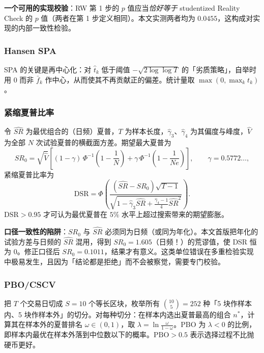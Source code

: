 \textbf{一个可用的实现校验}：RW 第 1 步的 $p$ 值应当\emph{恰好等于} studentized Reality Check 的 $p$ 值（两者在第 1 步定义相同）。本文实测两者均为 $0.0455$，这构成对实现的内部一致性检验。

\subsubsection*{Hansen SPA}

SPA 的关键是再中心化：对 $\hat t_k$ 低于阈值 $-\sqrt{2\log\log T}$ 的「劣质策略」，自举时用 $0$ 而非 $\bar f_k$ 作中心，从而使其不再贡献正的偏差。统计量取 $\max(0,\max_k t_k)$。

\subsubsection*{紧缩夏普比率}

令 $\widehat{SR}$ 为最优组合的（日频）夏普，$T$ 为样本长度，$\hat\gamma_3$、$\hat\gamma_4$ 为其偏度与峰度，$\hat V$ 为全部 $N$ 次试验夏普的横截面方差。期望最大夏普为
\begin{equation}
SR_0=\sqrt{\hat V}\left[(1-\gamma)\,\Phi^{-1}\!\left(1-\frac1N\right)
+\gamma\,\Phi^{-1}\!\left(1-\frac{1}{N e}\right)\right],
\qquad \gamma=0.5772\ldots ,
\end{equation}
紧缩夏普比率为
\begin{equation}
\text{DSR}=\Phi\!\left(\frac{\left(\widehat{SR}-SR_0\right)\sqrt{T-1}}
{\sqrt{1-\hat\gamma_3\widehat{SR}+\frac{\hat\gamma_4-1}{4}\widehat{SR}^2}}\right).
\end{equation}
$\text{DSR}>0.95$ 才可认为最优夏普在 $5\%$ 水平上超过搜索带来的期望膨胀。

\textbf{口径一致性的陷阱}：$SR_0$ 与 $\widehat{SR}$ 必须同为日频（或同为年化）。本文首版把年化的试验方差与日频的 $\widehat{SR}$ 混用，得到 $SR_0=1.605$（日频！）的荒谬值，使 DSR 恒为 $0$。修正口径后 $SR_0=0.1011$，结果才有意义。这类单位错误在多重检验实现中极易发生，且因为「结论都是拒绝」而不会被察觉，需要专门校验。

\subsubsection*{PBO/CSCV}

把 $T$ 个交易日切成 $S=10$ 个等长区块，枚举所有 $\binom{10}{5}=252$ 种「5 块作样本内、5 块作样本外」的切分。对每种切分：在样本内选出夏普最高的组合 $n^*$，计算其在样本外的夏普排名 $\omega\in(0,1)$，取 $\lambda=\ln\frac{\omega}{1-\omega}$。PBO 为 $\lambda<0$ 的比例，即样本内最优在样本外落到中位数以下的概率。$\text{PBO}>0.5$ 表示选择过程不比抛硬币更好。


